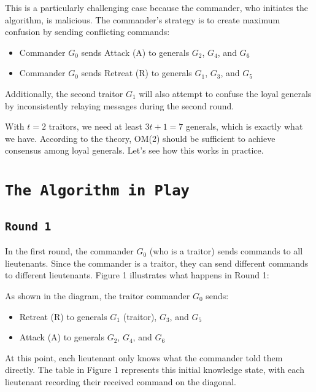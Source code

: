 \documentclass[11pt]{article}
\newcommand{\gen}[1]{\ensuremath{G_{#1}}}
\begin{document}
This is a particularly challenging case because the commander, who initiates the algorithm, is malicious. The commander's strategy is to create maximum confusion by sending conflicting commands:
\begin{itemize}
    \item Commander $G_0$ sends Attack (A) to generals $G_2$, $G_4$, and $G_6$
    \item Commander $G_0$ sends Retreat (R) to generals $G_1$, $G_3$, and $G_5$
\end{itemize}

Additionally, the second traitor $G_1$ will also attempt to confuse the loyal generals by inconsistently relaying messages during the second round.

With $t = 2$ traitors, we need at least $3t+1 = 7$ generals, which is exactly what we have. According to the theory, OM(2) should be sufficient to achieve consensus among loyal generals. Let's see how this works in practice.

\section*{\texttt{\Large The Algorithm in Play}}

\subsection*{\texttt{\large Round 1}}
\justifying
In the first round, the commander $\gen{0}$ (who is a traitor) sends commands to all lieutenants. Since the commander is a traitor, they can send different commands to different lieutenants. Figure 1 illustrates what happens in Round 1:

\begin{center}
    
\end{center}

\justifying
As shown in the diagram, the traitor commander $\gen{0}$ sends:
\begin{itemize}
    \item Retreat (R) to generals $\gen{1}$ (traitor), $\gen{3}$, and $\gen{5}$
    \item Attack (A) to generals $\gen{2}$, $\gen{4}$, and $\gen{6}$
\end{itemize}

At this point, each lieutenant only knows what the commander told them directly. The table in Figure 1 represents this initial knowledge state, with each lieutenant recording their received command on the diagonal.
\end{document}
